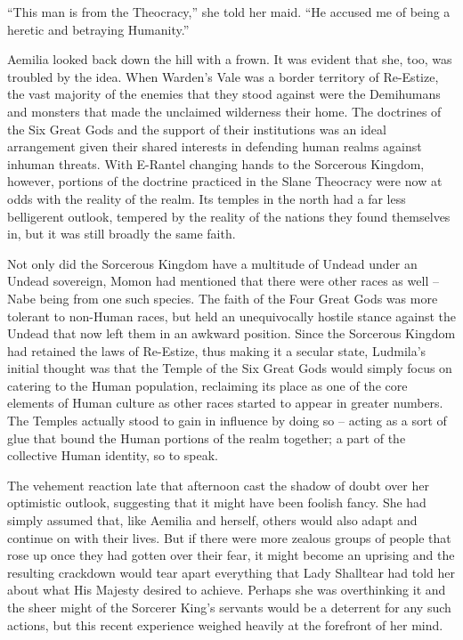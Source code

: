  

“This man is from the Theocracy,” she told her maid. “He accused me of being a heretic and betraying Humanity.”

 

Aemilia looked back down the hill with a frown. It was evident that she, too, was troubled by the idea. When Warden’s Vale was a border territory of Re-Estize, the vast majority of the enemies that they stood against were the Demihumans and monsters that made the unclaimed wilderness their home. The doctrines of the Six Great Gods and the support of their institutions was an ideal arrangement given their shared interests in defending human realms against inhuman threats. With E-Rantel changing hands to the Sorcerous Kingdom, however, portions of the doctrine practiced in the Slane Theocracy were now at odds with the reality of the realm. Its temples in the north had a far less belligerent outlook, tempered by the reality of the nations they found themselves in, but it was still broadly the same faith.

 

Not only did the Sorcerous Kingdom have a multitude of Undead under an Undead sovereign, Momon had mentioned that there were other races as well – Nabe being from one such species. The faith of the Four Great Gods was more tolerant to non-Human races, but held an unequivocally hostile stance against the Undead that now left them in an awkward position. Since the Sorcerous Kingdom had retained the laws of Re-Estize, thus making it a secular state, Ludmila’s initial thought was that the Temple of the Six Great Gods would simply focus on catering to the Human population, reclaiming its place as one of the core elements of Human culture as other races started to appear in greater numbers. The Temples actually stood to gain in influence by doing so – acting as a sort of glue that bound the Human portions of the realm together; a part of the collective Human identity, so to speak.

 

The vehement reaction late that afternoon cast the shadow of doubt over her optimistic outlook, suggesting that it might have been foolish fancy. She had simply assumed that, like Aemilia and herself, others would also adapt and continue on with their lives. But if there were more zealous groups of people that rose up once they had gotten over their fear, it might become an uprising and the resulting crackdown would tear apart everything that Lady Shalltear had told her about what His Majesty desired to achieve. Perhaps she was overthinking it and the sheer might of the Sorcerer King’s servants would be a deterrent for any such actions, but this recent experience weighed heavily at the forefront of her mind.

